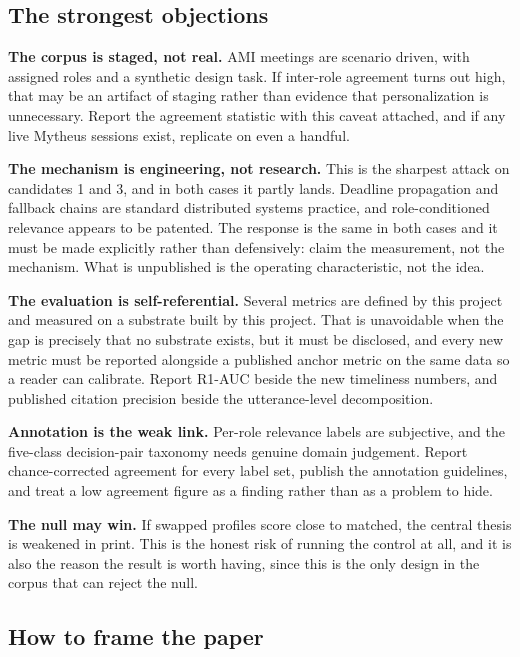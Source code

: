 \subsection{The strongest objections}

\textbf{The corpus is staged, not real.} AMI meetings are scenario driven, with
assigned roles and a synthetic design task. If inter-role agreement turns out
high, that may be an artifact of staging rather than evidence that
personalization is unnecessary. Report the agreement statistic with this caveat
attached, and if any live Mytheus sessions exist, replicate on even a handful.

\textbf{The mechanism is engineering, not research.} This is the sharpest
attack on candidates 1 and 3, and in both cases it partly lands. Deadline
propagation and fallback chains are standard distributed systems practice, and
role-conditioned relevance appears to be patented. The response is the same in
both cases and it must be made explicitly rather than defensively: claim the
measurement, not the mechanism. What is unpublished is the operating
characteristic, not the idea.

\textbf{The evaluation is self-referential.} Several metrics are defined by
this project and measured on a substrate built by this project. That is
unavoidable when the gap is precisely that no substrate exists, but it must be
disclosed, and every new metric must be reported alongside a published anchor
metric on the same data so a reader can calibrate. Report R1-AUC beside the new
timeliness numbers, and published citation precision beside the utterance-level
decomposition.

\textbf{Annotation is the weak link.} Per-role relevance labels are subjective,
and the five-class decision-pair taxonomy needs genuine domain judgement.
Report chance-corrected agreement for every label set, publish the annotation
guidelines, and treat a low agreement figure as a finding rather than as a
problem to hide.

\textbf{The null may win.} If swapped profiles score close to matched, the
central thesis is weakened in print. This is the honest risk of running the
control at all, and it is also the reason the result is worth having, since
this is the only design in the corpus that can reject the null.

\subsection{How to frame the paper}

